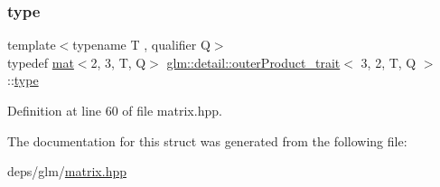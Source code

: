 \subsubsection{\texorpdfstring{type}{type}}
{\footnotesize\ttfamily template$<$typename T , qualifier Q$>$ \\
typedef \hyperlink{structglm_1_1mat}{mat}$<$2, 3, T, Q$>$ \hyperlink{structglm_1_1detail_1_1outerProduct__trait}{glm\+::detail\+::outer\+Product\+\_\+trait}$<$ 3, 2, T, Q $>$\+::\hyperlink{structglm_1_1mat_3_012_00_013_00_01T_00_01Q_01_4}{type}}



Definition at line 60 of file matrix.\+hpp.



The documentation for this struct was generated from the following file\+:\begin{DoxyCompactItemize}
\item 
deps/glm/\hyperlink{matrix_8hpp}{matrix.\+hpp}\end{DoxyCompactItemize}
